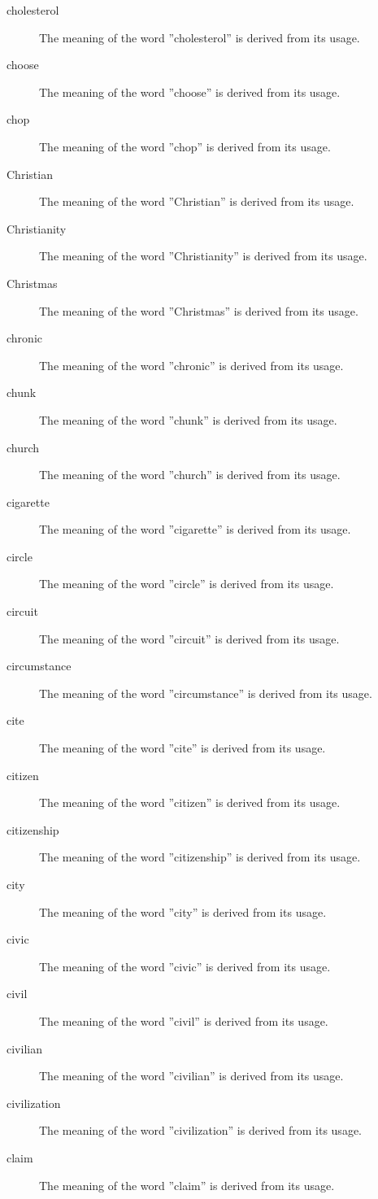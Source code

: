 \documentclass[12pt, letterpaper]{memoir}
\begin{document}
\begin{description}
\item[cholesterol] The meaning of the word ''cholesterol'' is derived from its usage.
\item[choose] The meaning of the word ''choose'' is derived from its usage.
\item[chop] The meaning of the word ''chop'' is derived from its usage.
\item[Christian] The meaning of the word ''Christian'' is derived from its usage.
\item[Christianity] The meaning of the word ''Christianity'' is derived from its usage.
\item[Christmas] The meaning of the word ''Christmas'' is derived from its usage.
\item[chronic] The meaning of the word ''chronic'' is derived from its usage.
\item[chunk] The meaning of the word ''chunk'' is derived from its usage.
\item[church] The meaning of the word ''church'' is derived from its usage.
\item[cigarette] The meaning of the word ''cigarette'' is derived from its usage.
\item[circle] The meaning of the word ''circle'' is derived from its usage.
\item[circuit] The meaning of the word ''circuit'' is derived from its usage.
\item[circumstance] The meaning of the word ''circumstance'' is derived from its usage.
\item[cite] The meaning of the word ''cite'' is derived from its usage.
\item[citizen] The meaning of the word ''citizen'' is derived from its usage.
\item[citizenship] The meaning of the word ''citizenship'' is derived from its usage.
\item[city] The meaning of the word ''city'' is derived from its usage.
\item[civic] The meaning of the word ''civic'' is derived from its usage.
\item[civil] The meaning of the word ''civil'' is derived from its usage.
\item[civilian] The meaning of the word ''civilian'' is derived from its usage.
\item[civilization] The meaning of the word ''civilization'' is derived from its usage.
\item[claim] The meaning of the word ''claim'' is derived from its usage.

\end{description}
\end{document}
